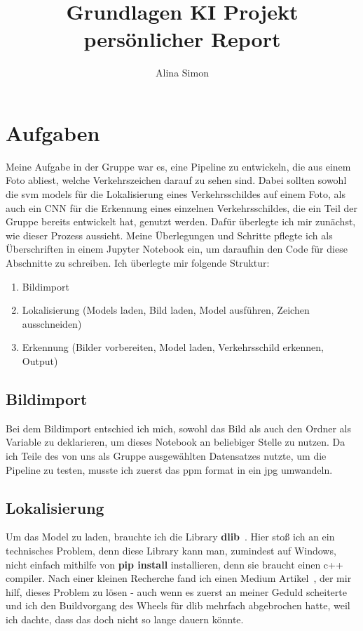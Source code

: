 \documentclass[runningheads]{llncs}
\begin{document}
\title{Grundlagen KI Projekt persönlicher Report}

\author{Alina Simon}



\maketitle

\section{Aufgaben}
Meine Aufgabe in der Gruppe war es, eine Pipeline zu entwickeln, die aus einem Foto abliest, welche Verkehrszeichen darauf zu sehen sind. 
Dabei sollten sowohl die svm models für die Lokalisierung eines Verkehrsschildes auf einem Foto, als auch ein CNN für die Erkennung eines einzelnen Verkehrsschildes, die ein Teil der Gruppe bereits entwickelt hat, genutzt werden.
Dafür überlegte ich mir zunächst, wie dieser Prozess aussieht. Meine Überlegungen und Schritte pflegte ich als Überschriften in einem Jupyter Notebook ein, um daraufhin den Code für diese Abschnitte zu schreiben. Ich überlegte mir folgende Struktur: 
\begin{enumerate}
  \item Bildimport
  \item Lokalisierung (Models laden, Bild laden, Model ausführen, Zeichen ausschneiden)
  \item Erkennung (Bilder vorbereiten, Model laden, Verkehrsschild erkennen, Output)
\end{enumerate}

\subsection{Bildimport}
Bei dem Bildimport entschied ich mich, sowohl das Bild als auch den Ordner als Variable zu deklarieren, um dieses Notebook an beliebiger Stelle zu nutzen. Da ich Teile des von uns als Gruppe ausgewählten Datensatzes nutzte, um die Pipeline zu testen, musste ich zuerst das ppm format in ein jpg umwandeln.

\subsection{Lokalisierung}
Um das Model zu laden, brauchte ich die Library \textbf{dlib}~\cite{ref_dlib_docs}. Hier stoß ich an ein technisches Problem, denn diese Library kann man, zumindest auf Windows, nicht einfach mithilfe von \textbf{pip install} installieren, denn sie braucht einen c++ compiler. Nach einer kleinen Recherche fand ich einen Medium Artikel~\cite{ref_medium}, der mir hilf, dieses Problem zu lösen - auch wenn es zuerst an meiner Geduld scheiterte und ich den Buildvorgang des Wheels für dlib mehrfach abgebrochen hatte, weil ich dachte, dass das doch nicht so lange dauern könnte.
\end{document}
